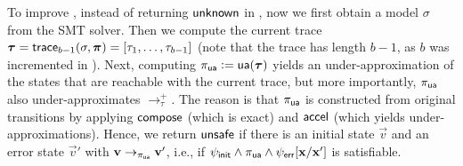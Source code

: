 To improve ,
instead of returning $\mathsf{unknown}$ in , now we first obtain a model $\sigma$ from the SMT solver.
%
Then we compute the current trace $\bm{\mathrm{\tau}} = \mathsf{trace}_{b-1}(\sigma,\bm{\mathrm{\pi}}) = [\tau_1,\ldots,\tau_{b-1}]$ (note that the trace has length $b-1$, as $b$ was incremented in ).
%
Next, computing $\pi_{\mathsf{ua}} \mathrel{\mathop:}= \mathsf{ua}(\bm{\mathrm{\tau}})$ yields an under-approximation of the states that are reachable with the current trace, but more importantly, $\pi_{\mathsf{ua}}$ also under-approximates $\to^+_\tau$.
%
The reason is that $\pi_{\mathsf{ua}}$ is constructed from original transitions
by applying ${\mathsf{compose}}$ (which is exact) and $\mathsf{accel}$ (which yields under-approximations).
%
Hence, we return $\mathsf{unsafe}$ if there is an initial state $\vec{v}$ and an error state $\vec{v}'$ with $\bm{\mathrm{v}} \to_{\pi_{\mathsf{ua}}} \bm{\mathrm{v}}'$, i.e., if $\psi_{\mathsf{init}} \land \pi_{\mathsf{ua}} \land \psi_{\mathsf{err}}[\bm{\mathrm{x}}/\bm{\mathrm{x}}']$ is satisfiable.

